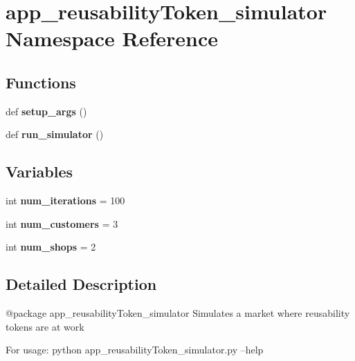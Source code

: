 \hypertarget{namespaceapp__reusability_token__simulator}{}\section{app\+\_\+reusability\+Token\+\_\+simulator Namespace Reference}
\label{namespaceapp__reusability_token__simulator}
\subsection*{Functions}
\begin{DoxyCompactItemize}
\item 
\mbox{\label{namespaceapp__reusability_token__simulator_ad7c965ffa90c952ccc9d4a5d38d89d82}} 
def {\bfseries setup\+\_\+args} ()
\item 
\mbox{\label{namespaceapp__reusability_token__simulator_a9076ad1236189e798219334d36b9ae2a}} 
def {\bfseries run\+\_\+simulator} ()
\end{DoxyCompactItemize}
\subsection*{Variables}
\begin{DoxyCompactItemize}
\item 
\mbox{\label{namespaceapp__reusability_token__simulator_addc9601ebae0635bff3008f214ffeddc}} 
int {\bfseries num\+\_\+iterations} = 100
\item 
\mbox{\label{namespaceapp__reusability_token__simulator_a0c869441de9440494fa9c97da0c28d1e}} 
int {\bfseries num\+\_\+customers} = 3
\item 
\mbox{\label{namespaceapp__reusability_token__simulator_abe6c8679105665a2d9602e97c8688699}} 
int {\bfseries num\+\_\+shops} = 2
\end{DoxyCompactItemize}


\subsection{Detailed Description}
\begin{DoxyVerb}@package app_reusabilityToken_simulator
Simulates a market where reusability tokens are at work

For usage: python app_reusabilityToken_simulator.py --help
\end{DoxyVerb}
 